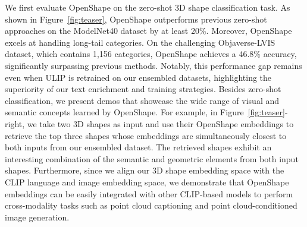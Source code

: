 We first evaluate OpenShape on the zero-shot 3D shape classification task. As shown in Figure~\ref{fig:teaser}, OpenShape outperforms previous zero-shot approaches on the ModelNet40 dataset by at least 20\%. Moreover, OpenShape excels at handling long-tail categories. On the challenging Objaverse-LVIS dataset, which contains 1,156 categories, OpenShape achieves a 46.8\% accuracy, significantly surpassing previous methods. Notably, this performance gap remains even when ULIP is retrained on our ensembled datasets, highlighting the superiority of our text enrichment and training strategies. Besides zero-shot classification, we present demos that showcase the wide range of visual and semantic concepts learned by OpenShape. For example, in Figure~\ref{fig:teaser}-right, we take two 3D shapes as input and use their OpenShape embeddings to retrieve the top three shapes whose embeddings are simultaneously closest to both inputs from our ensembled dataset. The retrieved shapes exhibit an interesting combination of the semantic and geometric elements from both input shapes. Furthermore, since we align our 3D shape embedding space with the CLIP language and image embedding space, we demonstrate that OpenShape embeddings can be easily integrated with other CLIP-based models to perform cross-modality tasks such as point cloud captioning and point cloud-conditioned image generation.
